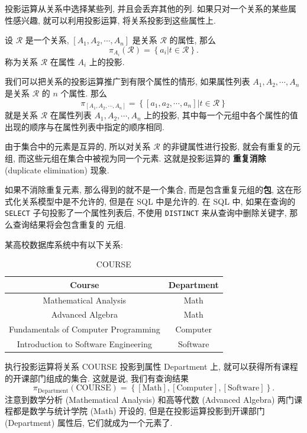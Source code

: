 \documentclass[10pt,UTF8]{book} %
\begin{document}
投影运算从关系中选择某些列, 并且会丢弃其他的列. 如果只对一个关系的某些属性感兴趣,
就可以利用投影运算, 将关系投影到这些属性上.

\begin{definition}[投影运算]
    设 $\mathcal{R}$ 是一个关系, $[A_1, A_2, \cdots, A_n]$ 是关系
    $\mathcal{R}$ 的属性,
    那么
    \[ \pi_{A_i}(\mathcal{R}) = \left\{
       a_i  | t\in\mathcal{R}
    \right\}. \]
    称为关系 $\mathcal{R}$ 在属性 $A_i$ 上的投影.
\end{definition}

我们可以把关系的投影运算推广到有限个属性的情形, 如果属性列表 $A_1, A_2, \cdots, A_n$
是关系 $\mathcal{R}$ 的 $n$ 个属性. 那么
\[ \pi_{[A_1, A_2, \cdots, A_n]} = \left\{
    [a_1, a_2,\cdots, a_n] | t \in \mathcal{R}
\right\} \]
就是关系 $\mathcal{R}$ 在属性列表 $A_1, A_2, \cdots, A_n$
上的投影, 其中每一个元组中各个属性的值出现的顺序与在属性列表中指定的顺序相同.

由于集合中的元素是互异的, 所以对关系 $\mathcal{R}$ 的非键属性进行投影,
就会有重复的元组, 而这些元组在集合中被视为同一个元素. 这就是投影运算的
\textbf{重复消除} (duplicate elimination) 现象.
\begin{remark}
    如果不消除重复元素, 那么得到的就不是一个集合, 而是包含重复元组的\textbf{包},
    这在形式化关系模型中是不允许的, 但是在 SQL 中是允许的. 在 SQL 中,
    如果在查询的 \lstinline|SELECT| 子句投影了一个属性列表后, 不使用
    \lstinline|DISTINCT| 来从查询中删除关键字, 那么查询结果将会包含重复的
    元组.
\end{remark}
\begin{example}
    某高校数据库系统中有以下关系:
    \begin{table}[H]
        \centering
        \caption{COURSE}
        \begin{tabular}{cc}
            \hline
            \textbf{Course} & \textbf{Department} \\ 
            \hline
            Mathematical Analysis & Math \\ 
            Advanced Algebra & Math \\ 
            Fundamentals of Computer Programming & Computer \\ 
            Introduction to Software Engineering & Software \\
            \hline
        \end{tabular}
    \end{table}
    执行投影运算将关系 COURSE 投影到属性 Department 上,
    就可以获得所有课程的开课部门组成的集合. 这就是说, 我们有查询结果
    \[ \pi_\mathrm{Department}(\mathrm{COURSE}) = \left\{
        [\mathrm{Math}], [\mathrm{Computer}], [\mathrm{Software}]
    \right\}. \]
    注意到数学分析 (Mathematical Analysis) 和高等代数 (Advanced Algebra)
    两门课程都是数学与统计学院 (Math) 开设的, 但是在投影运算投影到开课部门
    (Department) 属性后, 它们就成为一个元素了.
\end{example}
\end{document}
